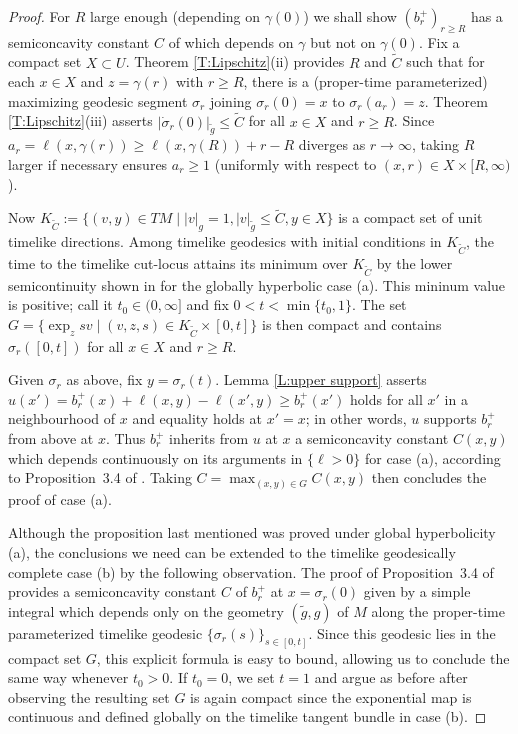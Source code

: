 \documentclass[12pt]{amsart}
\begin{document}
\begin{proof}
For $R$ large enough (depending on $\gamma(0)$) we shall show
 $(b^+_r)_{r \ge R}$ has a semiconcavity constant $C$ of which depends on $\gamma$ but not on $\gamma(0)$.
Fix a compact set $X \subset U$. Theorem \ref{T:Lipschitz}(ii) provides $R$ and $\tilde C$ such that for each $x \in X$ and $z =\gamma(r)$ with $r \ge R$,
there is a 
 (proper-time parameterized) maximizing geodesic segment $\sigma_r$ joining $\sigma_r(0)=x$ to $\sigma_r(a_r)=z$.
Theorem \ref{T:Lipschitz}(iii) asserts $|\dot \sigma_r(0)|_{\tilde g}  \le \tilde C$ for all $x \in X$ and $r \ge R$.
Since $a_r=\ell(x,\gamma(r)) \ge \ell(x,\gamma(R)) + r-R$ diverges as $r \to \infty$,  taking $R$ larger if necessary ensures $a_r \ge 1$ (uniformly with respect to $(x,r) \in X \times [R,\infty)$).


Now $K_{\tilde C} := \{ (v,y) \in TM \mid |v|_g=1, |v|_{\tilde g} \le \tilde C, y \in X\}$ is a compact set of unit timelike directions.
Among timelike geodesics with initial conditions in $K_{\tilde C}$, the time to the timelike cut-locus attains its minimum over
$K_{\tilde C}$ by the lower semicontinuity shown in \cite[Proposition 9.7]{BeemEhrlichEasley96} for 
{the globally hyperbolic} case (a).
This mininum value is positive; call it $t_0 \in (0,\infty]$ and fix $0<t<\min\{t_0,1\}$. The set $G = \{\exp_z sv \mid (v,z,s) \in K_{\tilde C} \times [0,t]\}$ is then compact and contains $\sigma_r({[0, t]})$ for all $x \in X$ and $r \ge R$.


Given $\sigma_r$ as above, fix $y=\sigma_r(t)$.
{Lemma \ref{L:upper support} asserts $u(x') = b^+_{r}(x)+\ell(x,y)-\ell(x',y) \ge b^+_{r}(x')$ holds for all $x'$ in a neighbourhood of $x$ and equality holds at $x'=x$; in other words, $u$ supports $b^+_{r}$ from above at $x$.  
Thus $b^+_{r}$ inherits} from $u$ at $x$ a semiconcavity constant $C(x,y)$ which depends continuously on its arguments in $\{\ell>0\}$
for case (a), according to Proposition~3.4 of \cite{McCann20}.
Taking $C = \max_{(x,y) \in G} C(x,y)$ then concludes the proof of case (a).  

Although the 
proposition last mentioned 
was proved under %
{global hyperbolicity} (a),  the conclusions we need can be extended to {the timelike geodesically complete case} %
(b) by the following observation.
The proof of Proposition~3.4 of \cite{McCann20} provides a semiconcavity constant $C$ of $b^+_r$ at $x=\sigma_r(0)$ given by a simple integral
which depends only on the geometry $(\tilde g,g)$ of $M$ along the proper-time parameterized timelike geodesic $\{\sigma_r(s)\}_{s \in [0,t]}$.  Since this geodesic lies in the compact set $G$,
this explicit formula is easy to bound, allowing us to conclude the same way whenever $t_0>0$.
If $t_0=0$, we 
set $t=1$ and argue as before after observing the resulting set $G$ is again compact since 
the exponential map is continuous and defined globally on the timelike tangent bundle in case (b).
\end{proof}
\end{document}

